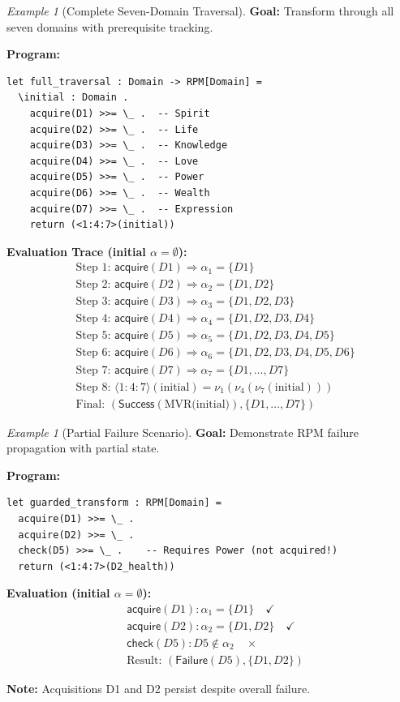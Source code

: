 \documentclass[11pt,twoside,openright]{book}
\theoremstyle{definition}
\theoremstyle{plain}
\theoremstyle{remark}
\newtheorem{example}[definition]{Example}
\newcommand{\noe}[1]{\nu_{#1}}
\begin{document}
\begin{example}[Complete Seven-Domain Traversal]
\label{ex:seven-domain}
\textbf{Goal:} Transform through all seven domains with prerequisite tracking.

\textbf{Program:}
\begin{verbatim}
let full_traversal : Domain -> RPM[Domain] =
  \initial : Domain .
    acquire(D1) >>= \_ .  -- Spirit
    acquire(D2) >>= \_ .  -- Life
    acquire(D3) >>= \_ .  -- Knowledge
    acquire(D4) >>= \_ .  -- Love
    acquire(D5) >>= \_ .  -- Power
    acquire(D6) >>= \_ .  -- Wealth
    acquire(D7) >>= \_ .  -- Expression
    return (<1:4:7>(initial))
\end{verbatim}

\textbf{Evaluation Trace (initial $\alpha = \emptyset$):}
\begin{align}
&\text{Step 1: } \mathsf{acquire}(D1) \Rightarrow \alpha_1 = \{D1\} \\
&\text{Step 2: } \mathsf{acquire}(D2) \Rightarrow \alpha_2 = \{D1, D2\} \\
&\text{Step 3: } \mathsf{acquire}(D3) \Rightarrow \alpha_3 = \{D1, D2, D3\} \\
&\text{Step 4: } \mathsf{acquire}(D4) \Rightarrow \alpha_4 = \{D1, D2, D3, D4\} \\
&\text{Step 5: } \mathsf{acquire}(D5) \Rightarrow \alpha_5 = \{D1, D2, D3, D4, D5\} \\
&\text{Step 6: } \mathsf{acquire}(D6) \Rightarrow \alpha_6 = \{D1, D2, D3, D4, D5, D6\} \\
&\text{Step 7: } \mathsf{acquire}(D7) \Rightarrow \alpha_7 = \{D1, \ldots, D7\} \\
&\text{Step 8: } \langle 1:4:7 \rangle(\text{initial}) = \noe{1}(\noe{4}(\noe{7}(\text{initial}))) \\
&\text{Final: } (\mathsf{Success}(\text{MVR(initial)}), \{D1, \ldots, D7\})
\end{align}
\end{example}

\begin{example}[Partial Failure Scenario]
\label{ex:partial-failure}
\textbf{Goal:} Demonstrate RPM failure propagation with partial state.

\textbf{Program:}
\begin{verbatim}
let guarded_transform : RPM[Domain] =
  acquire(D1) >>= \_ .
  acquire(D2) >>= \_ .
  check(D5) >>= \_ .    -- Requires Power (not acquired!)
  return (<1:4:7>(D2_health))
\end{verbatim}

\textbf{Evaluation (initial $\alpha = \emptyset$):}
\begin{align}
&\mathsf{acquire}(D1): \alpha_1 = \{D1\} \quad \checkmark \\
&\mathsf{acquire}(D2): \alpha_2 = \{D1, D2\} \quad \checkmark \\
&\mathsf{check}(D5): D5 \notin \alpha_2 \quad \times \\
&\text{Result: } (\mathsf{Failure}(D5), \{D1, D2\})
\end{align}

\textbf{Note:} Acquisitions D1 and D2 persist despite overall failure.
\end{example}
\end{document}
